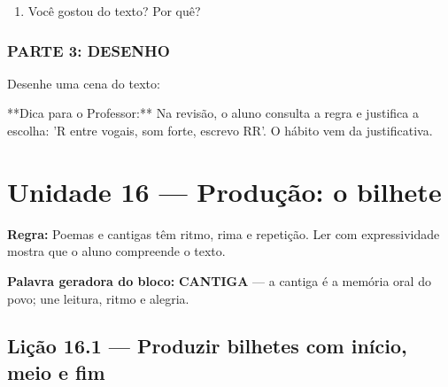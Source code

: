 \begin{exercicio}
\begin{enumerate}
  \item Você gostou do texto? Por quê?
  \begin{center}
  \underline{\hspace{12cm}}
  \end{center}

\end{enumerate}

\subsection*{PARTE 3: DESENHO}

Desenhe uma cena do texto:

\begin{center}
\end{center}

\end{exercicio}

\begin{dica}
**Dica para o Professor:** Na revisão, o aluno consulta a regra e justifica a escolha: 'R entre vogais, som forte, escrevo RR'. O hábito vem da justificativa.
\end{dica}


\chapter{Unidade 16 --- Produção: o bilhete}


\textbf{Regra:} Poemas e cantigas têm ritmo, rima e repetição. Ler com expressividade mostra que o aluno compreende o texto.

\textbf{Palavra geradora do bloco:} \textbf{CANTIGA} --- a cantiga é a memória oral do povo; une leitura, ritmo e alegria.

\section{Lição 16.1 --- Produzir bilhetes com início, meio e fim}

